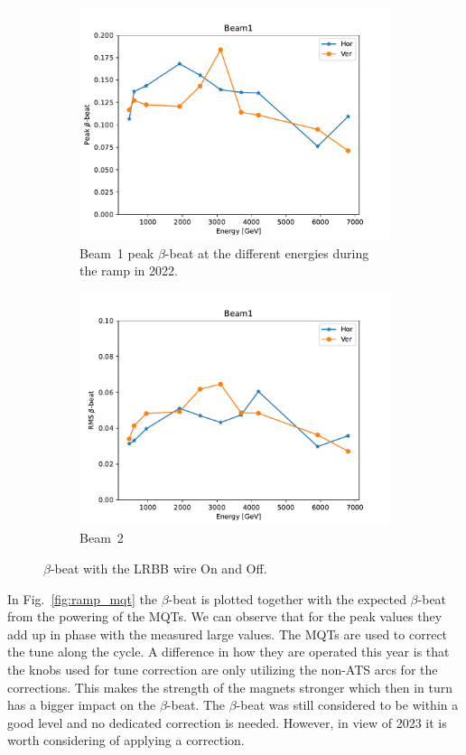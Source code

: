 \documentclass{cernatsnote}
\begin{document}
\begin{figure}[ht]
\begin{subfigure}{.5\textwidth}
  \centering
  \includegraphics[width=.8\linewidth]{ramp/Beam1_peak_filter.pdf}  
  \caption{Beam~1 peak $\beta$-beat at the different energies during the ramp in 2022.}
\end{subfigure}
\begin{subfigure}{.5\textwidth}
  \centering
  \includegraphics[width=.8\linewidth]{ramp/Beam1_rms_filter.pdf}  
  \caption{Beam~2}
\end{subfigure}
\caption{$\beta$-beat with the LRBB wire On and Off.}
\label{fig:ramp_peak_rms}
\end{figure}

In Fig.~\ref{fig:ramp_mqt} the $\beta$-beat is plotted together with the expected $\beta$-beat from the powering of the MQTs. We can observe that for the peak values they add up in phase with the measured large values. The MQTs are used to correct the tune along the cycle. A difference in how they are operated this year is that the knobs used for tune correction are only utilizing the non-ATS arcs for the corrections. This makes the strength of the magnets stronger which then in turn has a bigger impact on the $\beta$-beat. The $\beta$-beat was still considered to be within a good level and no dedicated correction is needed. However, in view of 2023 it is worth considering of applying a correction.
\end{document}
